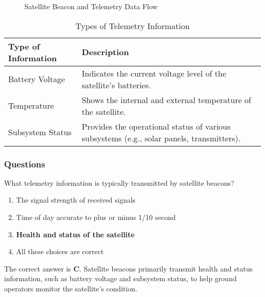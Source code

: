 \begin{figure}[h]
    \centering
    \caption{Satellite Beacon and Telemetry Data Flow}
    \label{fig:sat-beacon-telemetry}
\end{figure}

\begin{table}[h]
    \centering
    \begin{tabular}{|l|l|}
        \hline
        \textbf{Type of Information} & \textbf{Description} \\
        \hline
        Battery Voltage & Indicates the current voltage level of the satellite's batteries. \\
        Temperature & Shows the internal and external temperature of the satellite. \\
        Subsystem Status & Provides the operational status of various subsystems (e.g., solar panels, transmitters). \\
        \hline
    \end{tabular}
    \caption{Types of Telemetry Information}
    \label{tab:telemetry-types}
\end{table}

\subsubsection*{Questions}

\begin{tcolorbox}[colback=gray!10!white,colframe=black!75!black,title={T8B01}]
    What telemetry information is typically transmitted by satellite beacons?
    \begin{enumerate}[label=\Alph*),noitemsep]
        \item The signal strength of received signals
        \item Time of day accurate to plus or minus 1/10 second
        \item \textbf{Health and status of the satellite}
        \item All these choices are correct
    \end{enumerate}
\end{tcolorbox}
The correct answer is \textbf{C}. Satellite beacons primarily transmit health and status information, such as battery voltage and subsystem status, to help ground operators monitor the satellite's condition.

